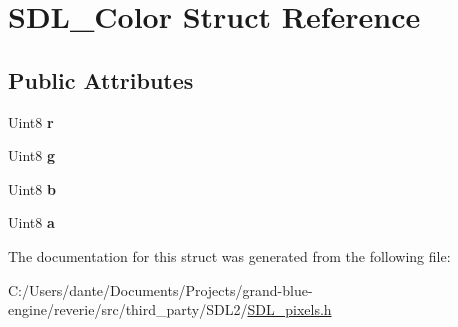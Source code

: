 \hypertarget{struct_s_d_l___color}{}\section{S\+D\+L\+\_\+\+Color Struct Reference}
\label{struct_s_d_l___color}
\subsection*{Public Attributes}
\begin{DoxyCompactItemize}
\item 
\mbox{\label{struct_s_d_l___color_a0bb975b6829524133fdd3c6060cfa63d}} 
Uint8 {\bfseries r}
\item 
\mbox{\label{struct_s_d_l___color_ae29d881bf740cfa7078b36e07f85d298}} 
Uint8 {\bfseries g}
\item 
\mbox{\label{struct_s_d_l___color_a3b79a27e0414049559aa5bcf241dedd3}} 
Uint8 {\bfseries b}
\item 
\mbox{\label{struct_s_d_l___color_ac497ba67af6ecb4d51bdd0945b314526}} 
Uint8 {\bfseries a}
\end{DoxyCompactItemize}


The documentation for this struct was generated from the following file\+:\begin{DoxyCompactItemize}
\item 
C\+:/\+Users/dante/\+Documents/\+Projects/grand-\/blue-\/engine/reverie/src/third\+\_\+party/\+S\+D\+L2/\mbox{\hyperlink{_s_d_l__pixels_8h}{S\+D\+L\+\_\+pixels.\+h}}\end{DoxyCompactItemize}
